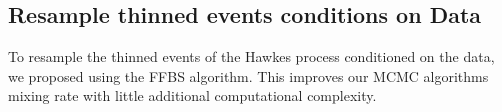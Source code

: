 \documentclass[11pt]{article}
\begin{document}
\subsection{Resample thinned events conditions on Data}

To resample the thinned events of the Hawkes process conditioned on the data, we proposed using the FFBS algorithm. This improves our MCMC algorithms mixing rate with little additional computational complexity.

\begin{comment}

\vspace{1cm}
\noindent\textbf{Probability Event is Thinned}


\[
  P(l_i | X, Y ,U) 
  =
  P(l_i | V)/ P(l_i | \lambda)
  =
  \text{PoissonProcess}(l_i)
\]

\vspace{1cm}
\noindent\textbf{Probability Event is Real}

\noindent Let's compute the probability the event is real. We include a base event at $t = 0$ so all observed events are children and immigrants are direct descendants of this base event. Let $V' = V \setminus \{v_i\}$, $Z' = Z \setminus \{z_i\}$,

\[
  P(a_i \text{ is real } | A \setminus \{a_i\}, X, \vtheta, \alpha)
\]
\[
  =
  P(a_i \text{ is real} | A \setminus \{a_i\}, X)
  =
  P(a_i \text{ is real} | V', Z', X)
  \propto
  P(a_i \text{ is real}, V', Z', X)
\]

\[
  =
  P(a_i \text{ is a child of any past event}, V', Z', X)   
\]

\[
  =
  P((v_i,z_i=1) , V', Z', X)   
\]

\noindent In words, we want the probability the virtual event was censored, indicated by $z_i = 1$. Note $v \in V$ is the event time of an event sampled from the Poisson Process and $z \in Z$ is a binary number indicating if the event is virtual or real (censored). Let's define $V_i,Z_i$ to be all the events before $a_i$ and including $(v_i,1)$. E.g. $V_i = \{a_k\}_ {k=1}^{i-1} \cup \{a_i\}$ and $Z_i = \{z_k\}_{k=1}^{i-1} \cup \{1\}$. Now we break up the distribution into its components:

\[
  =
  P(V')P(Z')P(a_i, X | V', Z')
  =
  P(V')P(Z')P(a_i, X | V_i, Z_i)
\]

\[
  =
  \text{PoissonProc}(V'; \lambda)
  \;
  \prod_{z \in Z'}\text{Bernoulli}(z; \alpha) 
  \;
  P(a_i, X | V_i, Z_i)  
\]

\[
  P(a_i, X | V_i, Z_i)
  =
  \sum_{p(a_i) \in \mathcal{P}}
  P(\text{not thinning } a_i \text{ with parent } p(a_i))
  \text{HawkesProc}(a_i,p(a_i),X,Y; \vtheta)
\]


\end{comment}
\end{document}
